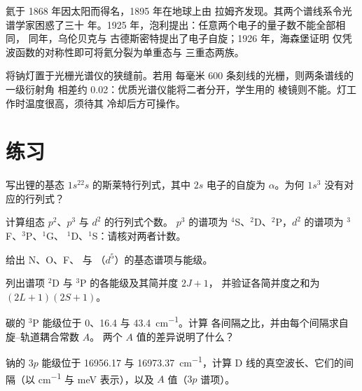 \begin{history}[两种“氦”与不相容原理]
氦于 1868 年因太阳而得名，1895 年在地球上由
拉姆齐发现。其两个谱线系令光谱学家困惑了三十
年。1925 年，泡利提出：任意两个电子的量子数不能全部相同，
同年，乌伦贝克与
古德斯密特提出了电子自旋；1926 年，海森堡证明
仅凭波函数的对称性即可将氦分裂为单重态与
三重态两族。
\end{history}

\begin{inthelab}[分辨钠双线]
将钠灯置于光栅光谱仪的狭缝前。若用
每毫米 600 条刻线的光栅，则两条谱线的一级衍射角
相差约 \num{0.02}\textdegree：优质光谱仪能将二者分开，学生用的
棱镜则不能。灯工作时温度很高，须待其
冷却后方可操作。
\end{inthelab}

\section{练习}

\begin{exercise}[$\star$]\label{exo:b3:many-electron-atoms:1}
写出锂的基态 $1s^22s$ 的斯莱特行列式，其中
$2s$ 电子的自旋为 $\alpha$。为何
$1s^3$ 没有对应的行列式？
\end{exercise}

\begin{exercise}[$\star$]\label{exo:b3:many-electron-atoms:2}
计算组态 $p^2$、$p^3$ 与 $d^2$ 的行列式个数。
$p^3$ 的谱项为 ${}^4$S、${}^2$D、${}^2$P，$d^2$ 的谱项为 ${}^3$F、${}^3$P、${}^1$G、
${}^1$D、${}^1$S：请核对两者计数。
\end{exercise}

\begin{exercise}[$\star$]\label{exo:b3:many-electron-atoms:3}
给出 N、O、F、 与 （$d^5$）的基态谱项与能级。
\end{exercise}

\begin{exercise}[$\star$]\label{exo:b3:many-electron-atoms:4}
列出谱项 ${}^2$D 与 ${}^3$P 的各能级及其简并度 $2J+1$，
并验证各简并度之和为 $(2L+1)(2S+1)$。
\end{exercise}

\begin{exercise}[$\star\star$]\label{exo:b3:many-electron-atoms:5}
碳的 ${}^3$P 能级位于 0、16.4 与 \qty{43.4}{cm^{-1}}。计算
各间隔之比，并由每个间隔求自旋–轨道耦合常数 $A$。
两个 $A$ 值的差异说明了什么？
\end{exercise}

\begin{exercise}[$\star\star$]\label{exo:b3:many-electron-atoms:6}
钠的 $3p$ 能级位于 16956.17 与 \qty{16973.37}{cm^{-1}}，计算
D 线的真空波长、它们的间隔（以 \unit{cm^{-1}} 与
meV 表示），以及 $A$ 值（$3p$ 谱项）。
\end{exercise}

